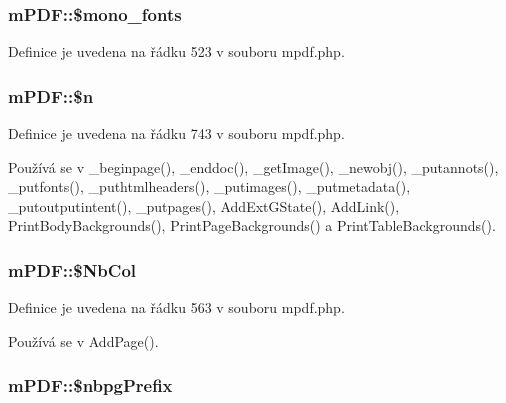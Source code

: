 \hypertarget{classm_p_d_f_a12ec56afba6bd5ef2902c36371567487}{
\subsubsection[{\$mono\-\_\-fonts}]{\setlength{\rightskip}{0pt plus 5cm}m\-P\-D\-F\-::\$mono\-\_\-fonts}}\label{classm_p_d_f_a12ec56afba6bd5ef2902c36371567487}


Definice je uvedena na řádku 523 v souboru mpdf.\-php.

\hypertarget{classm_p_d_f_a825893cb789f1a8845d65b8eea50f2eb}{
\subsubsection[{\$n}]{\setlength{\rightskip}{0pt plus 5cm}m\-P\-D\-F\-::\$n}}\label{classm_p_d_f_a825893cb789f1a8845d65b8eea50f2eb}


Definice je uvedena na řádku 743 v souboru mpdf.\-php.



Používá se v \-\_\-beginpage(), \-\_\-enddoc(), \-\_\-get\-Image(), \-\_\-newobj(), \-\_\-putannots(), \-\_\-putfonts(), \-\_\-puthtmlheaders(), \-\_\-putimages(), \-\_\-putmetadata(), \-\_\-putoutputintent(), \-\_\-putpages(), Add\-Ext\-G\-State(), Add\-Link(), Print\-Body\-Backgrounds(), Print\-Page\-Backgrounds() a Print\-Table\-Backgrounds().

\hypertarget{classm_p_d_f_a9bc00863cf175dad1e73e87e784b9b4d}{
\subsubsection[{\$\-Nb\-Col}]{\setlength{\rightskip}{0pt plus 5cm}m\-P\-D\-F\-::\$\-Nb\-Col}}\label{classm_p_d_f_a9bc00863cf175dad1e73e87e784b9b4d}


Definice je uvedena na řádku 563 v souboru mpdf.\-php.



Používá se v Add\-Page().

\hypertarget{classm_p_d_f_a7f572b33139b6eaea8a8764dc6343796}{
\subsubsection[{\$nbpg\-Prefix}]{\setlength{\rightskip}{0pt plus 5cm}m\-P\-D\-F\-::\$nbpg\-Prefix}}\label{classm_p_d_f_a7f572b33139b6eaea8a8764dc6343796}


